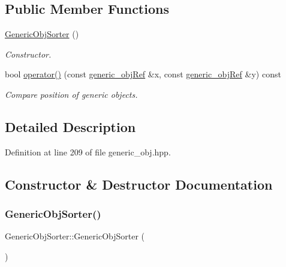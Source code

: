 \subsection*{Public Member Functions}
\begin{DoxyCompactItemize}
\item 
\hyperlink{classGenericObjSorter_a5bf592a019638b3986b3dac0b41526c7}{Generic\+Obj\+Sorter} ()
\begin{DoxyCompactList}\small\item\em Constructor. \end{DoxyCompactList}\item 
bool \hyperlink{classGenericObjSorter_a1ed342b14ada0fb75b19d08ee042f869}{operator()} (const \hyperlink{generic__obj_8hpp_acb533b2ef8e0fe72e09a04d20904ca81}{generic\+\_\+obj\+Ref} \&x, const \hyperlink{generic__obj_8hpp_acb533b2ef8e0fe72e09a04d20904ca81}{generic\+\_\+obj\+Ref} \&y) const
\begin{DoxyCompactList}\small\item\em Compare position of generic objects. \end{DoxyCompactList}\end{DoxyCompactItemize}


\subsection{Detailed Description}


Definition at line 209 of file generic\+\_\+obj.\+hpp.



\subsection{Constructor \& Destructor Documentation}
\mbox{\label{classGenericObjSorter_a5bf592a019638b3986b3dac0b41526c7}} 
\subsubsection{\texorpdfstring{Generic\+Obj\+Sorter()}{GenericObjSorter()}}
{\footnotesize\ttfamily Generic\+Obj\+Sorter\+::\+Generic\+Obj\+Sorter (\begin{DoxyParamCaption}{ }\end{DoxyParamCaption})\hspace{0.3cm}{\ttfamily [default]}}



